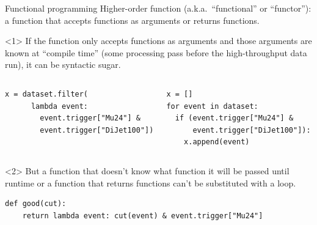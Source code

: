 \documentclass[aspectratio=169]{beamer}
\begin{document}
\begin{frame}[fragile]{Functional programming}
\vspace{0.5 cm}
Higher-order function (a.k.a.\ ``functional'' or ``functor''): a function that accepts functions as arguments or returns functions.

\vspace{0.5 cm}
\begin{onlyenv}<1>
If the function only accepts functions as arguments and those arguments are known at ``compile time'' (some processing pass before the high-throughput data run), it can be syntactic sugar.

\small
\begin{columns}[t]
\begin{verbatim}
x = dataset.filter(
      lambda event:
        event.trigger["Mu24"] &
        event.trigger["DiJet100"])
\end{verbatim}

\begin{verbatim}
x = []
for event in dataset:
  if (event.trigger["Mu24"] &
      event.trigger["DiJet100"]):
    x.append(event)
\end{verbatim}
\end{columns}
\end{onlyenv}
\begin{onlyenv}<2>
But a function that doesn't know what function it will be passed until runtime or a function that returns functions can't be substituted with a loop.

\small
\begin{verbatim}
def good(cut):
    return lambda event: cut(event) & event.trigger["Mu24"]
\end{verbatim}

\vspace{1.7 cm}
\end{onlyenv}
\end{frame}
\end{document}

